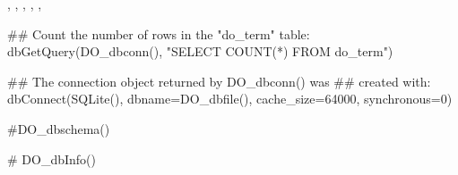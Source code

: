 \documentclass[a4paper]{book}
\begin{document}
%
\begin{SeeAlso}\relax
{},
,
,
,
,
\end{SeeAlso}
%
\begin{Examples}
\begin{ExampleCode}
  ## Count the number of rows in the "do_term" table:
  dbGetQuery(DO_dbconn(), "SELECT COUNT(*) FROM do_term")

  ## The connection object returned by DO_dbconn() was
  ## created with:
  dbConnect(SQLite(), dbname=DO_dbfile(), cache_size=64000,
  synchronous=0)

  #DO_dbschema()

#  DO_dbInfo()
\end{ExampleCode}
\end{Examples}
\printindex{}
\end{document}
